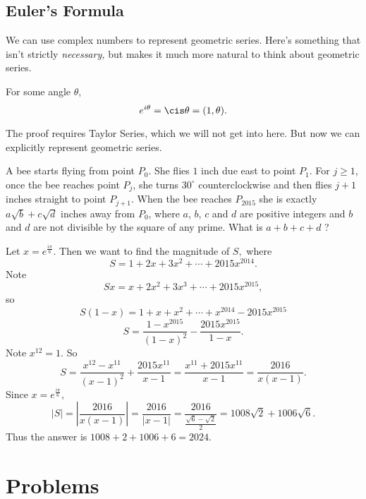 \documentclass{article}
\begin{document}
\subsection{Euler's Formula}
We can use complex numbers to represent geometric series. Here's something that isn't strictly \textit{necessary,} but makes it much more natural to think about geometric series.

\begin{theo}
For some angle $\theta,$
\[e^{i\theta}=\cis\theta=(1,\theta).\]
\end{theo}

The proof requires Taylor Series, which we will not get into here. But now we can explicitly represent geometric series.

\begin{exam}[AMC 12B 2015/25]
A bee starts flying from point $P_0$. She flies $1$ inch due east to point $P_1$. For $j \ge 1$, once the bee reaches point $P_j$, she turns $30^{\circ}$ counterclockwise and then flies $j+1$ inches straight to point $P_{j+1}$. When the bee reaches $P_{2015}$ she is exactly $a \sqrt{b} + c \sqrt{d}$ inches away from $P_0$, where $a$, $b$, $c$ and $d$ are positive integers and $b$ and $d$ are not divisible by the square of any prime. What is $a+b+c+d$ ?
\end{exam}

\begin{sol}
Let $x=e^{\frac{i\pi}{6}}.$ Then we want to find the magnitude of $S,$ where
\[S=1+2x+3x^2+\cdots+2015x^{2014}.\]
Note
\[Sx=x+2x^2+3x^3+\cdots+2015x^{2015},\]
so
\[S(1-x)=1+x+x^2+\cdots+x^{2014}-2015x^{2015}\]
\[S=\frac{1-x^{2015}}{(1-x)^2}-\frac{2015x^{2015}}{1-x}.\]
Note $x^{12}=1.$ So
\[S=\frac{x^{12}-x^{11}}{(x-1)^2}+\frac{2015x^{11}}{x-1}=\frac{x^{11}+2015x^{11}}{x-1}=\frac{2016}{x(x-1)}.\]
Since $x=e^{\frac{i\pi}{6}},$
\[|S|=|\frac{2016}{x(x-1)}|=\frac{2016}{|x-1|}=\frac{2016}{\frac{\sqrt{6}-\sqrt{2}}{2}}=1008\sqrt{2}+1006\sqrt{6}.\]
Thus the answer is $1008+2+1006+6=2024.$
\end{sol}

\pagebreak\section{Problems}

\minpt{}

\psetquote{}{}
\end{document}
